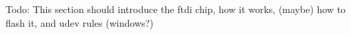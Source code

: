 \-Todo\-: \-This section should introduce the ftdi chip, how it works, (maybe) how to flash it, and udev rules (windows?) 